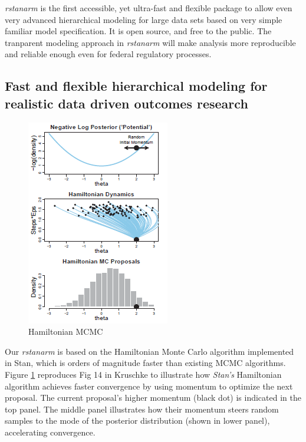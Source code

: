 \documentclass[11pt,notitlepage]{article}
\begin{document}
\textit{rstanarm} is the first accessible, yet ultra-fast and flexible package to allow even very advanced hierarchical modeling for large data sets based on very simple familiar model specification. It is open source, and free to the public. The tranparent modeling approach in \textit{rstanarm} will make analysis more reproducible and reliable enough even for federal regulatory processes. 

\subsection*{Fast and flexible hierarchical modeling for realistic data driven outcomes research }

\begin{figure}
  \vspace{-15pt}
 \includegraphics[scale=0.9]{Figures/Hamiltonian.png}
  \vspace{-20pt}
  \caption{Hamiltonian MCMC}
    \label{fig:Hamiltonian}
 \vspace{- 30 pt}
\end{figure}

Our \textit{rstanarm} is based on the Hamiltonian Monte Carlo algorithm implemented in Stan, which is orders of magnitude faster than existing MCMC algorithms. Figure \ref{fig:Hamiltonian} reproduces Fig 14 in Kruschke \cite{Kruschke_Book_2014} to illustrate how \textit{Stan's} Hamiltonian algorithm achieves faster convergence by using momentum to optimize the next proposal. The current proposal's higher momentum (black dot) is indicated in the top panel. The middle panel illustrates how their momentum steers random samples to the mode of the posterior distribution (shown in lower panel), accelerating convergence. 
\end{document}
